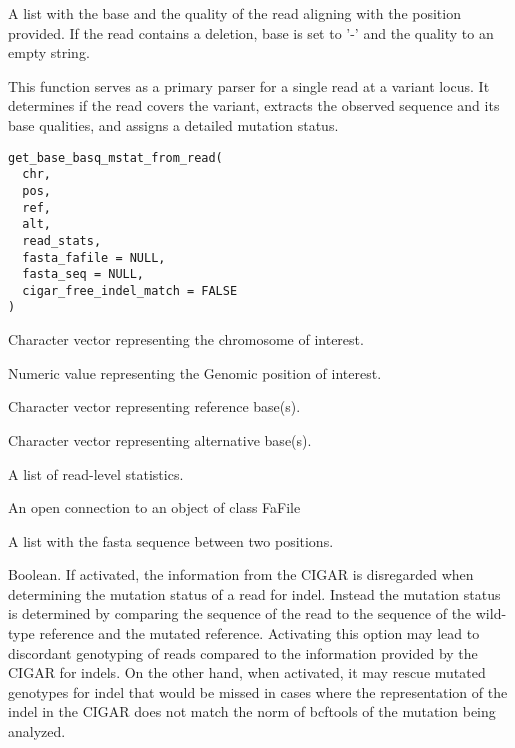 \documentclass[a4paper]{book}
\begin{document}
%
\begin{Value}
A list with the base and the quality of the read aligning with the position provided. If the read contains a
deletion, base is set to '-' and the quality to an empty string.
\end{Value}
%
\begin{Description}
This function serves as a primary parser for a single read at a variant locus. It determines if the
read covers the variant, extracts the observed sequence and its base qualities, and assigns a detailed mutation status.
\end{Description}
%
\begin{Usage}
\begin{verbatim}
get_base_basq_mstat_from_read(
  chr,
  pos,
  ref,
  alt,
  read_stats,
  fasta_fafile = NULL,
  fasta_seq = NULL,
  cigar_free_indel_match = FALSE
)
\end{verbatim}
\end{Usage}
%
\begin{Arguments}
\begin{ldescription}
\item[\code{chr}] Character vector representing the chromosome of interest.

\item[\code{pos}] Numeric value representing the Genomic position of interest.

\item[\code{ref}] Character vector representing reference base(s).

\item[\code{alt}] Character vector representing alternative base(s).

\item[\code{read\_stats}] A list of read-level statistics.

\item[\code{fasta\_fafile}] An open connection to an object of class FaFile

\item[\code{fasta\_seq}] A list with the fasta sequence between two positions.

\item[\code{cigar\_free\_indel\_match}] Boolean. If activated, the information from the CIGAR is disregarded when determining the
mutation status of a read for indel. Instead the mutation status is determined by comparing the sequence of the read
to the sequence of the wild-type reference and the mutated reference. Activating this option may lead to discordant
genotyping of reads compared to the information provided by the CIGAR for indels. On the other hand, when
activated, it may rescue mutated genotypes for indel that would be missed in cases where the representation of the
indel in the CIGAR does not match the norm of bcftools of the mutation being analyzed.
\end{ldescription}
\end{Arguments}
\end{document}
